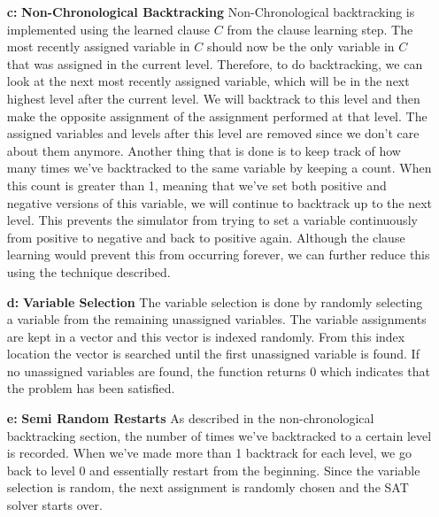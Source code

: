 \documentclass[9pt]{extarticle}
\begin{document}
\begin{homeworkProblem}[Implementation]
\begin{enumerate}
        \item[\textbf{c:}] \textbf{Non-Chronological Backtracking}
        Non-Chronological backtracking is implemented using the learned clause $C$ from the clause learning step.
        The most recently assigned variable in $C$ should now be the only variable in $C$ that was assigned in the
        current level. Therefore, to do backtracking, we can look at the next most recently assigned variable, which
        will be in the next highest level after the current level. We will backtrack to this level and then make the 
        opposite assignment of the assignment performed at that level. The assigned variables and levels after this
        level are removed since we don't care about them anymore. Another thing that is done is to keep track of 
        how many times we've backtracked to the same variable by keeping a count. When this count is greater than 1,
        meaning that we've set both positive and negative versions of this variable, we will continue to backtrack
        up to the next level. This prevents the simulator from trying to set a variable continuously from positive
        to negative and back to positive again. Although the clause learning would prevent this from occurring 
        forever, we can further reduce this using the technique described. 

        \item[\textbf{d:}]\textbf{Variable Selection}
            The variable selection is done by randomly selecting a variable from the remaining unassigned variables.
            The variable assignments are kept in a vector and this vector is indexed randomly. From this index 
            location the vector is searched until the first unassigned variable is found. If no unassigned variables
            are found, the function returns 0 which indicates that the problem has been satisfied.

        \item[\textbf{e:}]\textbf{Semi Random Restarts}
            As described in the non-chronological backtracking section, the number of times we've backtracked to 
            a certain level is recorded. When we've made more than 1 backtrack for each level, we go back to level
            0 and essentially restart from the beginning. Since the variable selection is random, the next assignment
            is randomly chosen and the SAT solver starts over.

    \end{enumerate}
\end{homeworkProblem}
\end{document}
